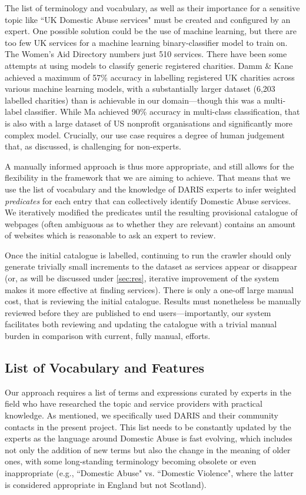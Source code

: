\documentclass[conference]{IEEEtran}
\begin{document}
The list of terminology and vocabulary, as well as their importance for a sensitive topic like ``UK Domestic Abuse services" must be created and configured by an expert. One possible solution could be the use of machine learning, but 
there are too few UK services for a machine learning binary-classifier model to train on.
The Women's Aid Directory numbers just 510 services.
There have been some attempts at using models to classify generic registered charities.
Damm \& Kane \cite{dammkane2021} achieved a maximum of 57\% accuracy in labelling registered UK charities across various machine learning models, with a substantially larger dataset (6,203 labelled charities) than is achievable in our domain---though this was a multi-label classifier. 
While Ma \cite{ma2020} achieved 90\% accuracy in multi-class classification, that is also with a large dataset of US nonprofit organisations and significantly more complex model. 
Crucially, our use case requires a degree of human judgement that, as discussed, is challenging for non-experts.

A manually informed approach is thus more appropriate, and still allows for the flexibility in the framework that we are aiming to achieve.
That means that we use the list of vocabulary and the knowledge of DARIS experts to infer weighted \textit{predicates} for each entry that can collectively identify Domestic Abuse services. 
We iteratively modified the predicates until the resulting provisional catalogue of webpages (often ambiguous as to whether they are relevant) contains an amount of websites which is reasonable to ask an expert to review.

Once the initial catalogue is labelled, continuing to run the crawler should only generate trivially small increments to the dataset as services appear or disappear (or, as will be discussed under \cref{sec:res}, iterative improvement of the system makes it more effective at finding services).
There is only a one-off large manual cost, that is reviewing the initial catalogue. 
Results must nonetheless be manually reviewed before they are published to end users---importantly, our system facilitates both reviewing and updating the catalogue with a trivial manual burden in comparison with current, fully manual, efforts.



\subsection{List of Vocabulary and Features}
\label{sec:vocab}
Our approach requires a list of terms and expressions curated by experts in the field who have researched the topic and service providers with practical knowledge. 
As mentioned, we specifically used DARIS and their community contacts in the present project\cite{theme}. 
This list needs to be constantly updated by the experts as the language around Domestic Abuse is fast evolving, which includes not only the addition of new terms but also the change in the meaning of older ones, with some long-standing terminology becoming obsolete or even inappropriate (e.g., ``Domestic Abuse" vs. ``Domestic Violence", where the latter is considered appropriate in England but not Scotland).
\end{document}
